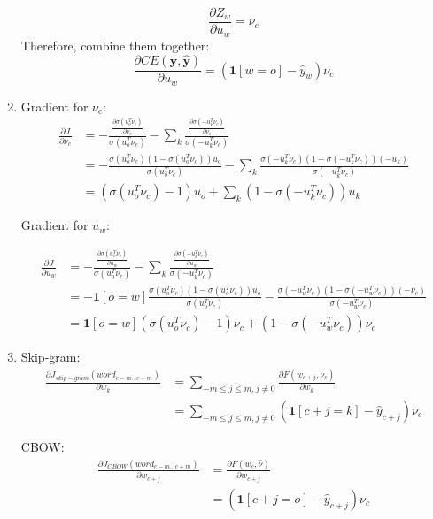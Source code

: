 \documentclass[10pt]{article}
\begin{document}
\begin{enumerate}[label=(\alph*)]
\begin{equation*}
	\frac{\partial Z_w}{\partial u_w} = \nu_c
\end{equation*}
Therefore, combine them together:
\begin{equation*}
	\frac{\partial CE(\mathbf{y}, \mathbf{\hat{y}})}{\partial u_w} = (\mathbf{1}[w=o] - \hat{y}_w)\nu_c
\end{equation*}

\item
Gradient for $\nu_c$:
\begin{equation*}
\begin{aligned}
	\frac{\partial J}{\partial \nu_c} & = -\frac{\frac{\partial \sigma(u_o^T\nu_c)}{\partial \nu_c}}{\sigma(u_o^T\nu_c)} - \sum_k \frac{\frac{\partial \sigma(-u_k^T\nu_c)}{\partial \nu_c}}{\sigma(-u_k^T\nu_c)}\\
	& = -\frac{\sigma(u_o^T\nu_c)(1-\sigma(u_o^T\nu_c))u_o}{\sigma(u_o^T\nu_c)} - \sum_k \frac{\sigma(-u_k^T\nu_c)(1-\sigma(-u_k^T\nu_c))(-u_k)}{\sigma(-u_k^T\nu_c)}\\
	& = (\sigma(u_o^T\nu_c)-1)u_o + \sum_k(1-\sigma(-u_k^T\nu_c))u_k
\end{aligned}
\end{equation*}

Gradient for $u_w$:

\begin{equation*}
\begin{aligned}
	\frac{\partial J}{\partial u_w} & = -\frac{\frac{\partial \sigma(u_o^T\nu_c)}{\partial u_w}}{\sigma(u_o^T\nu_c)} - \sum_k \frac{\frac{\partial \sigma(-u_k^T\nu_c)}{\partial u_w}}{\sigma(-u_k^T\nu_c)}\\
	& = -\mathbf{1}[o=w]\frac{\sigma(u_o^T\nu_c)(1-\sigma(u_o^T\nu_c))u_o}{\sigma(u_o^T\nu_c)} - \frac{\sigma(-u_w^T\nu_c)(1-\sigma(-u_w^T\nu_c))(-\nu_c)}{\sigma(-u_w^T\nu_c)}\\
	& = \mathbf{1}[o=w](\sigma(u_o^T\nu_c)-1)\nu_c + (1-\sigma(-u_w^T\nu_c))\nu_c
\end{aligned}
\end{equation*}

\item
Skip-gram:
\begin{equation*}
\begin{aligned}
	\frac{\partial J_{skip-gram}(word_{c-m...c+m})}{\partial w_{k}} & = \sum_{-m\le j\le m, j\neq0} \frac{\partial F(w_{c+j}, \nu_c)}{\partial w_{k}}\\
	& = \sum_{-m\le j\le m, j\neq0}(\mathbf{1}[c+j=k] - \hat{y}_{c+j})\nu_c
\end{aligned}
\end{equation*}

CBOW:
\begin{equation*}
\begin{aligned}
	\frac{\partial J_{CBOW}(word_{c-m...c+m})}{\partial w_{c+j}} & = \frac{\partial F(w_{c}, \hat{\nu})}{\partial w_{c+j}}\\
	& = (\mathbf{1}[c+j=o] - \hat{y}_{c+j})\nu_c
\end{aligned}
\end{equation*}


\end{enumerate}
\end{document}
